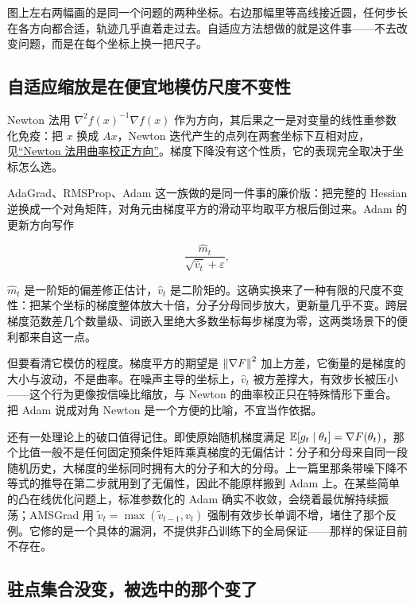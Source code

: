 图上左右两幅画的是同一个问题的两种坐标。右边那幅里等高线接近圆，任何步长在各方向都合适，轨迹几乎直着走过去。自适应方法想做的就是这件事——不去改变问题，而是在每个坐标上换一把尺子。

\subsection{自适应缩放是在便宜地模仿尺度不变性}

Newton 法用 \(\nabla^2f(x)^{-1}\nabla f(x)\) 作为方向，其后果之一是对变量的线性重参数化免疫：把 \(x\) 换成 \(Ax\)，Newton 迭代产生的点列在两套坐标下互相对应，见\hyperref[sec:09-Convex-Optimization/06-Optimization-Algorithms/02]{``Newton 法用曲率校正方向''}。梯度下降没有这个性质，它的表现完全取决于坐标怎么选。

AdaGrad、RMSProp、Adam 这一族做的是同一件事的廉价版：把完整的 Hessian 逆换成一个对角矩阵，对角元由梯度平方的滑动平均取平方根后倒过来。Adam 的更新方向写作

\[
\frac{\widehat m_t}{\sqrt{\widehat v_t}+\varepsilon},
\]

\(\widehat m_t\) 是一阶矩的偏差修正估计，\(\widehat v_t\) 是二阶矩的。这确实换来了一种有限的尺度不变性：把某个坐标的梯度整体放大十倍，分子分母同步放大，更新量几乎不变。跨层梯度范数差几个数量级、词嵌入里绝大多数坐标每步梯度为零，这两类场景下的便利都来自这一点。

但要看清它模仿的程度。梯度平方的期望是 \(\left\lVert\nabla F\right\rVert^2\) 加上方差，它衡量的是梯度的大小与波动，不是曲率。在噪声主导的坐标上，\(\widehat v_t\) 被方差撑大，有效步长被压小——这个行为更像按信噪比缩放，与 Newton 的曲率校正只在特殊情形下重合。把 Adam 说成对角 Newton 是一个方便的比喻，不宜当作依据。

还有一处理论上的破口值得记住。即使原始随机梯度满足 \(\mathbb{E}[g_t\mid\theta_t]=\nabla F(\theta_t)\)，那个比值一般不是任何固定预条件矩阵乘真梯度的无偏估计：分子和分母来自同一段随机历史，大梯度的坐标同时拥有大的分子和大的分母。上一篇里那条带噪下降不等式的推导在第二步就用到了无偏性，因此不能原样搬到 Adam 上。在某些简单的凸在线优化问题上，标准参数化的 Adam 确实不收敛，会绕着最优解持续振荡；AMSGrad 用 \(\widetilde v_t=\max(\widetilde v_{t-1},v_t)\) 强制有效步长单调不增，堵住了那个反例。它修的是一个具体的漏洞，不提供非凸训练下的全局保证——那样的保证目前不存在。

\subsection{驻点集合没变，被选中的那个变了}

